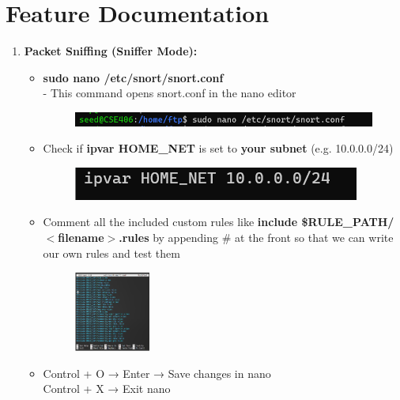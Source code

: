 \documentclass[12pt, A4Paper]{article}
\begin{document}
\section{Feature Documentation}
\begin{enumerate}
    \item \textbf{\large{Packet Sniffing (Sniffer Mode):}}
    \begin{itemize}
        \item \textbf{sudo nano /etc/snort/snort.conf}\\ 
    - This command opens snort.conf in the nano editor
        \begin{figure}[h]
            \centering
            \includegraphics{images/sudo_nano_conf}
        \end{figure}
        
        \item Check if \textbf{ipvar HOME\_NET} is set to \textbf{your subnet} (e.g. 10.0.0.0/24)
        \begin{figure}[h]
            \centering
            \includegraphics{images/HOME_NET}
        \end{figure}

        \item Comment all the included custom rules like \textbf{include \$RULE\_PATH/$<$filename$>$.rules} by appending \# at the front so that we can write our own rules and test them
        \begin{figure}[h]
            \centering
            \includegraphics[width=0.25\textwidth]{images/comment_rules.PNG}
        \end{figure}

        \item Control + O → Enter → Save changes in nano\\
        Control + X → Exit nano


\end{itemize}
\end{enumerate}
\end{document}
